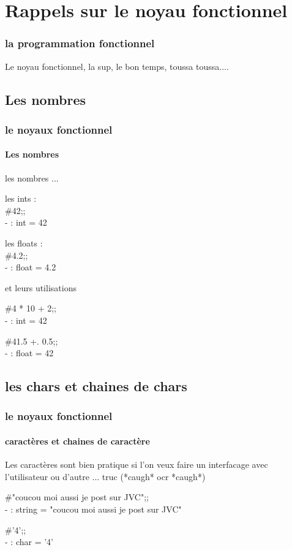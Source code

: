 \section{Rappels sur le noyau fonctionnel}

\begin{frame}
  \begin{center}
    \frametitle{la programmation fonctionnel}
  Le noyau fonctionnel, la sup, le bon temps, toussa toussa....
  \end{center}
\end{frame}

\subsection{Les nombres}
\begin{frame}
  \frametitle{le noyaux fonctionnel}
  \framesubtitle{Les nombres}
  \begin{center}
    les nombres ...\\
   \begin{minipage}[t]{5cm}
    les ints : \\
    \#42;;\\
    - : int  = 42\\
   \end{minipage}
   \begin{minipage}[t]{5cm}
    les floats :\\
    \#4.2;;\\
    - : float = 4.2
   \end{minipage}
   \vspace{0.5cm}
    et leurs utilisations\\
   \begin{minipage}[t]{5cm}
    \#4 * 10 + 2;;\\
      - : int = 42
   \end{minipage}
   \begin{minipage}[t]{5cm}
     \#41.5 +. 0.5;;\\
     - : float = 42
   \end{minipage}
  \end{center}
\end{frame}

  \subsection{les chars et chaines de chars}
  \begin{frame}
    \frametitle{le noyaux fonctionnel}
    \framesubtitle{caractères et chaines de caractère}
    Les caractères sont bien pratique si l'on veux faire un interfacage avec l'utilisateur ou d'autre ... truc (*caugh* ocr *caugh*)\\
    \begin{minipage}[t]{10cm}
      \#"coucou moi aussi je post sur JVC";;\\
      - : string = "coucou moi aussi je post sur JVC"
    \end{minipage}
    \begin{minipage}[t]{5cm}
      \#'4';;\\
      - : char = '4'
    \end{minipage}
  \end{frame}

